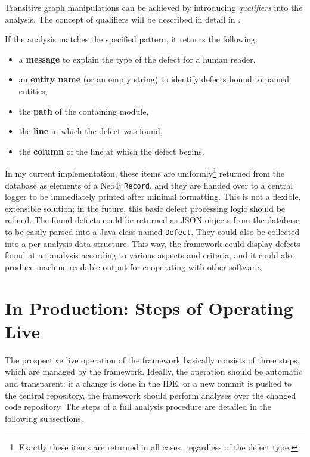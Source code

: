 Transitive graph manipulations can be achieved by introducing \emph{qualifiers} into the analysis. The concept of qualifiers will be described in detail in .

If the analysis matches the specified pattern, it returns the following:

\begin{itemize}
\item a \textbf{message} to explain the type of the defect for a human reader,
\item an \textbf{entity name} (or an empty string) to identify defects bound to named entities,
\item the \textbf{path} of the containing module,
\item the \textbf{line} in which the defect was found,
\item the \textbf{column} of the line at which the defect begins.
\end{itemize}

In my current implementation, these items are uniformly\footnote{Exactly these items are returned in all cases, regardless of the defect type.} returned from the database as elements of a Neo4j \lstinline{Record}, and they are handed over to a central logger to be immediately printed after minimal formatting. This is not a flexible, extensible solution; in the future, this basic defect processing logic should be refined. The found defects could be returned as JSON objects from the database to be easily parsed into a Java class named \lstinline{Defect}. They could also be collected into a per-analysis data structure. This way, the framework could display defects found at an analysis according to various aspects and criteria, and it could also produce machine-readable output for cooperating with other software.


\section{In Production: Steps of Operating Live}

The prospective live operation of the framework basically consists of three steps, which are managed by the framework. Ideally, the operation should be automatic and transparent: if a change is done in the IDE, or a new commit is pushed to the central repository, the framework should perform analyses over the changed code repository. The steps of a full analysis procedure are detailed in the following subsections.


